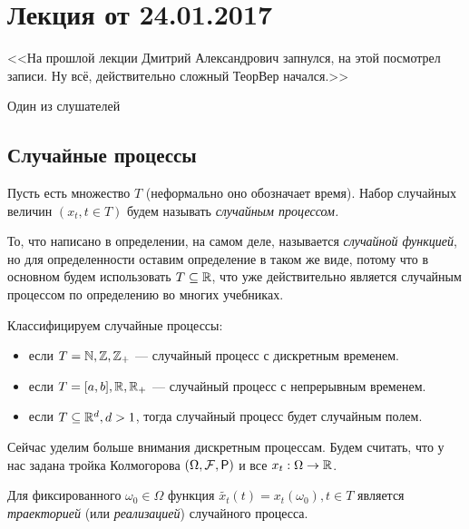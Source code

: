 \section{Лекция от 24.01.2017}

\epigraph{<<На прошлой лекции Дмитрий Александрович запнулся, на этой посмотрел записи. Ну всё, действительно сложный ТеорВер начался.>>}
{Один из слушателей}

\subsection{Случайные процессы}

\begin{definition}
  Пусть есть множество $T$ (неформально оно обозначает время). Набор случайных
  величин $(x_t, t \in T)$ будем называть \emph{случайным процессом.}
\end{definition}

\begin{remark}
  То, что написано в определении, на самом деле, называется \emph{случайной функцией},
  но для определенности оставим определение в таком же виде, потому что в основном
  будем использовать $T \subseteq \mathbb{R}$, что уже действительно является случайным
  процессом по определению во многих учебниках.
\end{remark}

\begin{definition}
  Классифицируем случайные процессы:
  \begin{itemize}
    \item если $T = \mathbb{N}, \mathbb{Z}, \mathbb{Z}_{+}$ --- случайный процесс с дискретным временем.
    \item если $T = [a, b], \mathbb{R}, \mathbb{R}_{+}$ --- случайный процесс с непрерывным
    временем.
    \item если $T \subseteq \mathbb{R}^d, d > 1$, тогда случайный процесс будет случайным
    полем.
  \end{itemize}
\end{definition}

Сейчас уделим больше внимания дискретным процессам. Будем считать, что у нас
задана тройка Колмогорова $(\Omega, \F, \Pr)$ и все $x_t: \Omega \to \mathbb{R}$.

\begin{definition}
  Для фиксированного $\omega_0 \in \Omega$ функция $\tilde{x_t}(t) = x_t(\omega_0), t \in T$
  является \emph{траекторией} (или \emph{реализацией}) случайного процесса.
\end{definition}

